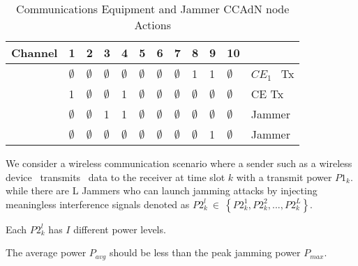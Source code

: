 \documentclass[letterpaper%
, oneside%
, 12pt%
,thesepararticles%
, english%
,creativecommons,hyperref, withAlgo2e%
]{thETS}
\begin{document}
\begin{table}[h]

 \centering       
\begin{tabular}{|p{}|p{}|p{}|p{}|p{}|p{}|p{}|p{}|p{}|p{}|p{}|p{}|}
\hline 
 Channel & 1 & 2 & 3 & 4 &  5 & 6 & 7 & 8 & 9 & 10 &  \\
\hline 
  & $\displaystyle \emptyset $ & $\displaystyle \emptyset $ & $\displaystyle \emptyset $ & $\displaystyle \emptyset $ & $\displaystyle \emptyset $ & $\displaystyle \emptyset $ & $\displaystyle \emptyset $ & 1 & 1 & $\displaystyle \emptyset $ & $\displaystyle CE_{1}$ \ Tx \\
\hline 
  & 1 & $\displaystyle \emptyset $ & $\displaystyle \emptyset $ & 1 & $\displaystyle \emptyset $ & $\displaystyle \emptyset $ & $\displaystyle \emptyset $ & $\displaystyle \emptyset $ & $\displaystyle \emptyset $ & $\displaystyle \emptyset $ & CE Tx \\
\hline 
  & $\displaystyle \emptyset $ & $\displaystyle \emptyset $ & 1 & 1 & $\displaystyle \emptyset $ & $\displaystyle \emptyset $ & $\displaystyle \emptyset $ & $\displaystyle \emptyset $ & $\displaystyle \emptyset $ & $\displaystyle \emptyset $ & Jammer \\
\hline 
  & $\displaystyle \emptyset $ & $\displaystyle \emptyset $ & $\displaystyle \emptyset $ & $\displaystyle \emptyset $ & $\displaystyle \emptyset $ & $\displaystyle \emptyset $ & $\displaystyle \emptyset $ & $\displaystyle \emptyset $ & 1 & $\displaystyle \emptyset $ & Jammer \\
 \hline
\end{tabular}
        \caption{Communications Equipment and Jammer CCAdN node Actions}
\end{table}
 
 
 We consider a wireless communication scenario where a sender such as a wireless device \ transmits \ data to the receiver at time slot $\displaystyle k$ with a transmit power $\displaystyle P1_{k}$. while there are L Jammers who can launch jamming attacks by injecting meaningless interference signals denoted as $\displaystyle P2_{k}^{l} \ \in \ \left\{P2_{k}^{1} ,P2_{k}^{2} ,...,P2_{k}^{L}\right\} .$

Each $\displaystyle P2_{k}^{l}$ has $\displaystyle I$ different power levels. 



 The average power $\displaystyle P_{avg}$ should be less than the peak jamming power $\displaystyle P_{max}$. 
\end{document}
